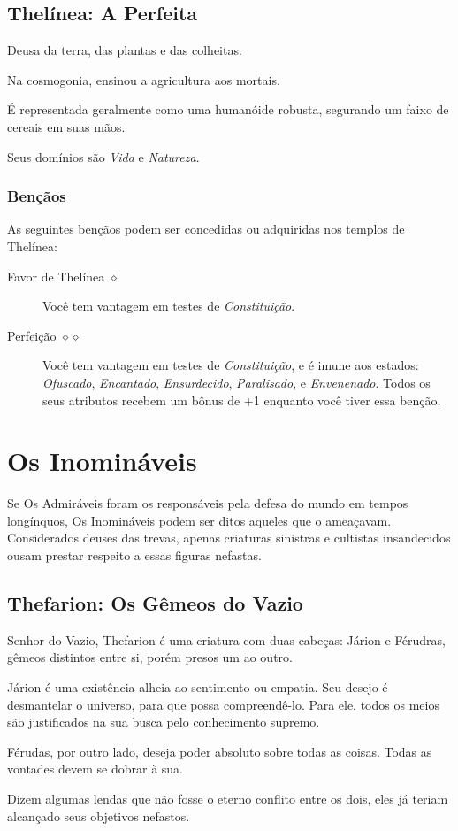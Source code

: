 \documentclass[letterpaper,twocolumn,openany]{dndbook}
\begin{document}
	\subsection{Thelínea: A Perfeita}
	Deusa da terra, das plantas e das colheitas.
	\par Na cosmogonia, ensinou a agricultura aos mortais.
	\par É representada geralmente como uma humanóide robusta, segurando um faixo de cereais em suas mãos.
	\par Seus domínios são \textit{Vida} e \textit{Natureza}.
	\subsubsection{Bençãos}
	As seguintes bençãos podem ser concedidas ou adquiridas nos templos de Thelínea:
	\begin{description}
		\item[Favor de Thelínea $\diamond$]
		Você tem vantagem em testes de \textit{Constituição}.
		\item[Perfeição $\diamond\diamond$]
		Você tem vantagem em testes de \textit{Constituição}, e é imune aos estados: \textit{Ofuscado}, \textit{Encantado}, \textit{Ensurdecido}, \textit{Paralisado}, e \textit{Envenenado}.
		Todos os seus atributos recebem um bônus de +1 enquanto você tiver essa benção.
	\end{description}
	
	\section{Os Inomináveis}
	Se Os Admiráveis foram os responsáveis pela defesa do mundo em tempos longínquos, Os Inomináveis podem ser ditos aqueles que o ameaçavam. Considerados deuses das trevas, apenas criaturas sinistras e cultistas insandecidos ousam prestar respeito a essas figuras nefastas.
	
	\subsection{Thefarion: Os Gêmeos do Vazio}
	Senhor do Vazio, Thefarion é uma criatura com duas cabeças: Járion e Férudras, gêmeos distintos entre si, porém presos um ao outro.
	\par Járion é uma existência alheia ao sentimento ou empatia. Seu desejo é desmantelar o universo, para que possa compreendê-lo. Para ele, todos os meios são justificados na sua busca pelo conhecimento supremo.
	\par Férudas, por outro lado, deseja poder absoluto sobre todas as coisas. Todas as vontades devem se dobrar à sua.
	\par Dizem algumas lendas que não fosse o eterno conflito entre os dois, eles já teriam alcançado seus objetivos nefastos.
	
\end{document}
